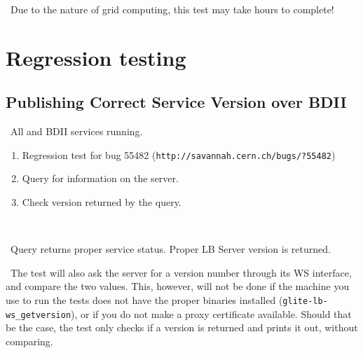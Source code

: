 \note\ Due to the nature of grid computing, this test may take hours to complete!  



\section{Regression testing}

\subsection{Publishing Correct Service Version over BDII}
\req\ All \LB and BDII services running.

\what
\begin{enumerate}
\item Regression test for bug 55482 (\texttt{http://savannah.cern.ch/bugs/?55482})
\item Query for information on the server.
\item Check version returned by the query.
\end{enumerate}

\how\ 

\result\ Query returns proper service status. Proper LB Server version is returned.

\note\ The test will also ask the \LB server for a version number through its WS interface, and compare the two values. This, however, will not be done if the machine you use to run the tests does not have the proper binaries installed (\texttt{glite-lb-ws\_getversion}), or if you do not make a proxy certificate available. Should that be the case, the test only checks if a version is returned and prints it out, without comparing.

